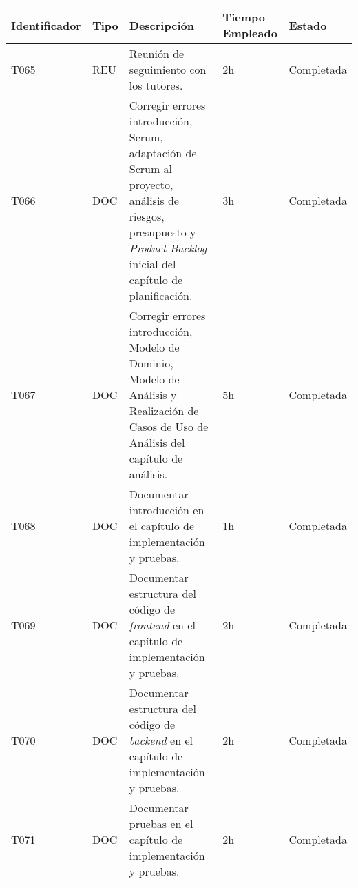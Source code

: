 \begin{table}[]
  \centering
\begin{tabular}{
  |p{}%
  |p{}%
  |p{}
  |p{}
  |p{}
  |%
  }
  \hline
  \textbf{Identificador} & \textbf{Tipo} & \textbf{Descripción}                                             & \textbf{Tiempo Empleado} & \textbf{Estado} \\ \hline
  T065                   & REU           & Reunión de seguimiento con los tutores.                             & 2h                       & Completada      \\ \hline

  T066                   & DOC           & Corregir errores introducción, Scrum, adaptación de Scrum al proyecto, análisis de riesgos, presupuesto y \textit{Product Backlog} inicial del capítulo de planificación.                  & 3h                       & Completada      \\ \hline

  T067                   & DOC           & Corregir errores introducción, Modelo de Dominio, Modelo de Análisis y Realización de Casos de Uso de Análisis del capítulo de análisis.                  & 5h                       & Completada      \\ \hline

  
  T068                   & DOC           & Documentar introducción en el capítulo de implementación y pruebas.            & 1h                       & Completada      \\ \hline

  T069                   & DOC           & Documentar estructura del código de \textit{frontend} en el capítulo de implementación y pruebas.            & 2h                       & Completada      \\ \hline

  T070                   & DOC           & Documentar estructura del código de \textit{backend} en el capítulo de implementación y pruebas.            & 2h                       & Completada      \\ \hline

  T071                   & DOC           & Documentar pruebas en el capítulo de implementación y pruebas.            & 2h                       & Completada      \\ \hline


\end{tabular}
\end{table}
